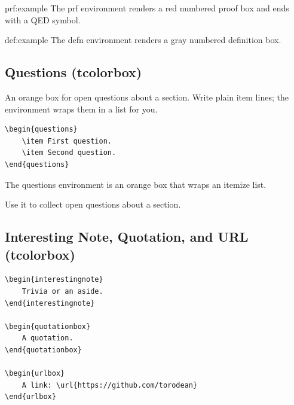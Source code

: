 \begin{prf}{prf:example}
	The prf environment renders a red numbered proof box and ends with a QED symbol.
\end{prf}

\begin{defn}{def:example}
	The defn environment renders a gray numbered definition box.
\end{defn}

\subsection{Questions (tcolorbox)}

An orange box for open questions about a section. Write plain item lines; the environment wraps them in a list for you.

\begin{lstlisting}[style=latexstyle]
\begin{questions}
	\item First question.
	\item Second question.
\end{questions}
\end{lstlisting}

\begin{questions}
	\item The questions environment is an orange box that wraps an itemize list.
	\item Use it to collect open questions about a section.
\end{questions}

\subsection{Interesting Note, Quotation, and URL (tcolorbox)}

\begin{lstlisting}[style=latexstyle]
\begin{interestingnote}
	Trivia or an aside.
\end{interestingnote}

\begin{quotationbox}
	A quotation.
\end{quotationbox}

\begin{urlbox}
	A link: \url{https://github.com/torodean}
\end{urlbox}
\end{lstlisting}

